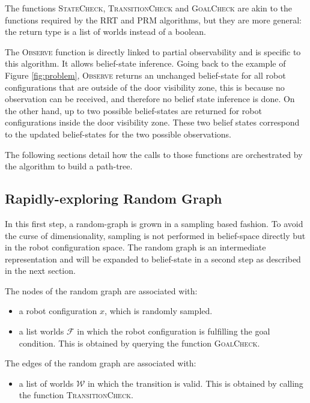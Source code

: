 \documentclass[letterpaper, 10 pt, conference]{ieeeconf}  %
\begin{document}
The functions \textsc{StateCheck}, \textsc{TransitionCheck} and \textsc{GoalCheck} are akin to the functions required by the RRT and PRM algorithms, but they are more general: the return type is a list of worlds instead of a boolean.

The \textsc{Observe} function is directly linked to partial observability and is specific to this algorithm. It allows belief-state inference. Going back to the example of Figure \ref{fig:problem}, \textsc{Observe} returns an unchanged belief-state for all robot configurations that are outside of the door visibility zone, this is because no observation can be received, and therefore no belief state inference is done. On the other hand, up to two possible belief-states are returned for robot configurations inside the door visibility zone. These two belief states correspond to the updated belief-states for the two possible observations.

The following sections detail how the calls to those functions are orchestrated by the algorithm to build a path-tree.

\subsection{Rapidly-exploring Random Graph}
\label{section:rapidly-exploring-random-graph}

In this first step, a random-graph is grown in a sampling based fashion. To avoid the curse of dimensionality, sampling is not performed in belief-space directly but in the robot configuration space. The random graph is an intermediate representation and will be expanded to belief-state in a second step as described in the next section.

The nodes of the random graph are associated with:
\begin{itemize}
\item a robot configuration $x$, which is randomly sampled.
\item a list worlds $\mathcal{F}$ in which the robot configuration is fulfilling the goal condition. This is obtained by querying the function \textsc{GoalCheck}. 
\end{itemize} 

The edges of the random graph are associated with:
\begin{itemize}
\item a list of worlds $\mathcal{W}$ in which the transition is valid. This is obtained by calling the function \textsc{TransitionCheck}.
\end{itemize}
\end{document}
